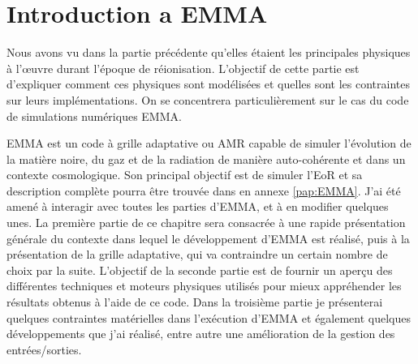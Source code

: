 \chapter{Introduction a EMMA}
\label{ch:introduction}


Nous avons vu dans la partie précédente qu'elles étaient les principales physiques à l’œuvre durant l'époque de réionisation.
L'objectif de cette partie est d'expliquer comment ces physiques sont modélisées et quelles sont les contraintes sur leurs implémentations.
On se concentrera particulièrement sur le cas du code de simulations numériques EMMA.

EMMA est un code à grille adaptative ou \ac{AMR} capable de simuler l'évolution de la matière noire, du gaz et de la radiation de manière auto-cohérente et dans un contexte cosmologique.
Son principal objectif est de simuler l'\ac{EoR} et sa description complète pourra être trouvée dans \cite{aubert_emma:_2015} en annexe \ref{pap:EMMA}.
J'ai été amené à interagir avec toutes les parties d'EMMA, et à en modifier quelques unes.
La première partie de ce chapitre sera consacrée à une rapide présentation générale du contexte dans lequel le développement d'EMMA est réalisé, puis à la présentation de la grille adaptative, qui va contraindre un certain nombre de choix par la suite.
L'objectif de la seconde partie est de fournir un aperçu des différentes techniques et moteurs physiques utilisés pour mieux appréhender les résultats obtenus à l'aide de ce code.
Dans la troisième partie je présenterai quelques contraintes matérielles dans l'exécution d'EMMA et également quelques développements que j'ai réalisé, entre autre une amélioration de la gestion des entrées/sorties.



